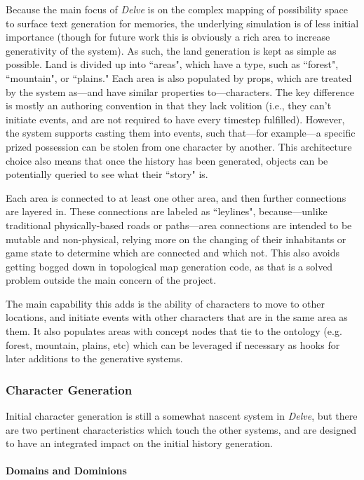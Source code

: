 Because the main focus of \textit{Delve} is on the complex mapping of possibility space to surface text generation for memories, the underlying simulation is of less initial importance (though for future work this is obviously a rich area to increase generativity of the system). As such, the land generation is kept as simple as possible. Land is divided up into ``areas", which have a type, such as ``forest", ``mountain", or ``plains." Each area is also populated by props, which are treated by the system as---and have similar properties to---characters. The key difference is mostly an authoring convention in that they lack volition (i.e., they can't initiate events, and are not required to have every timestep fulfilled). However, the system supports casting them into events, such that---for example---a specific prized possession can be stolen from one character by another. This architecture choice also means that once the history has been generated, objects can be potentially queried to see what their ``story" is.

Each area is connected to at least one other area, and then further connections are layered in. These connections are labeled as ``leylines", because---unlike traditional physically-based roads or paths---area connections are intended to be mutable and non-physical, relying more on the changing of their inhabitants or game state to determine which are connected and which not. This also avoids getting bogged down in topological map generation code, as that is a solved problem outside the main concern of the project.

The main capability this adds is the ability of characters to move to other locations, and initiate events with other characters that are in the same area as them. It also populates areas with concept nodes that tie to the ontology (e.g. forest, mountain, plains, etc) which can be leveraged if necessary as hooks for later additions to the generative systems.

\subsubsection{Character Generation}\label{subsubsec:delve-character-generation}

Initial character generation is still a somewhat nascent system in \textit{Delve}, but there are two pertinent characteristics which touch the other systems, and are designed to have an integrated impact on the initial history generation.

\paragraph{Domains and Dominions}\label{par:domains-and-dominions}

